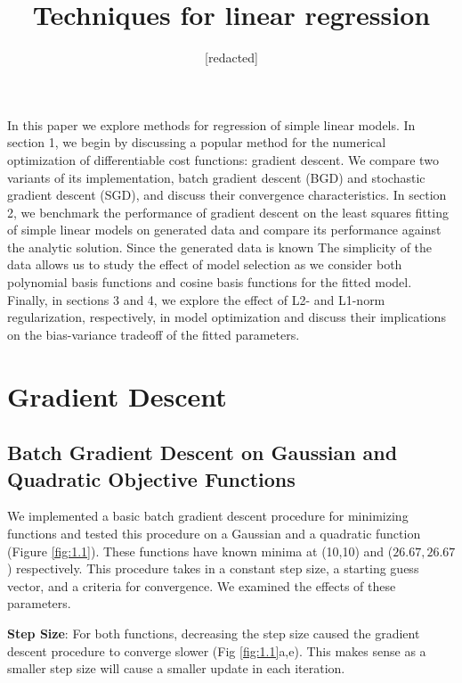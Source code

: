 \documentclass[10pt]{article}
\begin{document}
 
\title{Techniques for linear regression}
\author{[redacted]}
\maketitle
 
In this paper we explore methods for regression of simple linear models. In section 1, we begin by discussing a popular method for the numerical optimization of differentiable cost functions: gradient descent. We compare two variants of its implementation, batch gradient descent (BGD) and stochastic gradient descent (SGD), and discuss their convergence characteristics. In section 2, we benchmark the performance of gradient descent on the least squares fitting of simple linear models on generated data and compare its performance against the analytic solution. Since the generated data is known The simplicity of the data allows us to study the effect of model selection as we consider both polynomial basis functions and cosine basis functions for the fitted model. Finally, in sections 3 and 4, we explore the effect of L2- and L1-norm regularization, respectively, in model optimization and discuss their implications on the bias-variance tradeoff of the fitted parameters.

\section{Gradient Descent}

\subsection{Batch Gradient Descent on Gaussian and Quadratic Objective Functions}

 We implemented a basic batch gradient descent procedure for minimizing functions and tested this procedure on a Gaussian and  a quadratic function (Figure \ref{fig:1.1}). These functions have known minima at (10,10) and ($26.67,26.67$) respectively. This procedure takes in a constant step size, a starting guess vector, and a criteria for convergence. We examined the effects of these parameters.
 
 \medskip

 \textbf{Step Size}: For both functions, decreasing the step size caused the gradient descent procedure to converge slower (Fig \ref{fig:1.1}a,e). This makes sense as a smaller step size will cause a smaller update in each iteration. 
 
\end{document}
